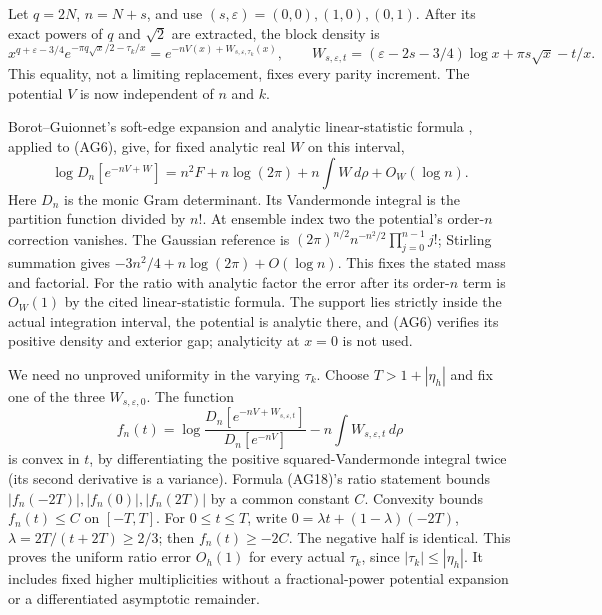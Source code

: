 \documentclass[11pt,a4paper]{article}
\providecommand{\dd}{\,d}
\begin{document}
Let $q=2N$, $n=N+s$, and use $(s,\varepsilon)=(0,0),(1,0),(0,1)$.
After its exact powers of $q$ and $\sqrt2$ are extracted, the block density is
\begin{equation}\tag{AG17}
 x^{q+\varepsilon-3/4}e^{-\pi q\sqrt x/2-\tau_k/x}
 =e^{-nV(x)+W_{s,\varepsilon,\tau_k}(x)},\qquad
 W_{s,\varepsilon,t}=(\varepsilon-2s-3/4)\log x+\pi s\sqrt x-t/x.
\end{equation}
This equality, not a limiting replacement, fixes every parity increment.
The potential $V$ is now independent of $n$ and $k$.

Borot--Guionnet's soft-edge expansion and analytic linear-statistic formula
\cite[Propositions 1.2 and 5.2, equations (1-3)--(1-6)]{a03ag:BG}, applied to
(AG6), give, for fixed analytic real $W$ on this interval,
\begin{equation}\tag{AG18}
 \log D_n[e^{-nV+W}]
 =n^2F+n\log(2\pi)+n\int W\dd\rho+O_W(\log n).
\end{equation}
Here $D_n$ is the monic Gram determinant. Its Vandermonde integral is the
partition function divided by $n!$. At ensemble index two the potential's
order-$n$ correction vanishes. The Gaussian reference is
$(2\pi)^{n/2}n^{-n^2/2}\prod_{j=0}^{n-1}j!$; Stirling summation gives
$-3n^2/4+n\log(2\pi)+O(\log n)$. This fixes the stated mass and factorial.
For the ratio with analytic factor the error after its order-$n$ term is
$O_W(1)$ by the cited linear-statistic formula. The support lies strictly
inside the actual integration interval, the potential is analytic there,
and (AG6) verifies its positive density and exterior gap; analyticity at
$x=0$ is not used.

We need no unproved uniformity in the varying $\tau_k$. Choose
$T>1+|\eta_h|$ and fix one of the three $W_{s,\varepsilon,0}$.
The function
\[
 f_n(t)=\log\frac{D_n[e^{-nV+W_{s,\varepsilon,t}}]}{D_n[e^{-nV}]}
                  -n\int W_{s,\varepsilon,t}\dd\rho
\]
is convex in $t$, by differentiating the positive squared-Vandermonde
integral twice (its second derivative is a variance).
Formula (AG18)'s ratio statement bounds $|f_n(-2T)|,|f_n(0)|,|f_n(2T)|$
by a common constant $C$. Convexity bounds $f_n(t)\le C$ on $[-T,T]$.
For $0\le t\le T$, write $0=\lambda t+(1-\lambda)(-2T)$,
$\lambda=2T/(t+2T)\ge2/3$; then $f_n(t)\ge-2C$.
The negative half is identical. This proves the uniform ratio error $O_h(1)$
for every actual $\tau_k$, since $|\tau_k|\le|\eta_h|$.
It includes fixed higher multiplicities without a fractional-power potential
expansion or a differentiated asymptotic remainder.
\end{document}
